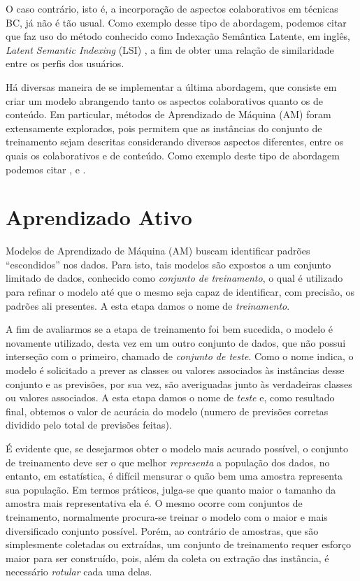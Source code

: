 O caso contrário, isto é, a incorporação de aspectos colaborativos em técnicas BC, já não é tão usual. Como exemplo desse tipo de abordagem, podemos citar \citep{Nicholas99combiningcontent} que faz uso do método conhecido como Indexação Semântica Latente, em inglês, \textit{Latent Semantic Indexing} (LSI) \citep{Berry:1999:USE:307681}, a fim de obter uma relação de similaridade entre os perfis dos usuários.

Há diversas maneira de se implementar a última abordagem, que consiste em criar um modelo abrangendo tanto os aspectos colaborativos quanto os de conteúdo. Em particular, métodos de Aprendizado de Máquina (AM) foram extensamente explorados, pois permitem que as instâncias do conjunto de treinamento sejam descritas considerando diversos aspectos diferentes, entre os quais os colaborativos e de conteúdo. Como exemplo deste tipo de abordagem podemos citar \citep{ansari:2000}, \citep{Condliff99bayesianmixed-effects} e \citep{Popescul01probabilisticmodels}.

\section{Aprendizado Ativo}
\label{sec:aprendizado-ativo}
Modelos de Aprendizado de Máquina (AM) buscam identificar padrões ``escondidos'' nos dados. Para isto, tais modelos são expostos a um conjunto limitado de dados, conhecido como \textit{conjunto de treinamento}, o qual é utilizado para refinar o modelo até que o mesmo seja capaz de identificar, com precisão, os padrões ali presentes. A esta etapa damos o nome de \textit{treinamento}.

A fim de avaliarmos se a etapa de treinamento foi bem sucedida, o modelo é novamente utilizado, desta vez em um outro conjunto de dados, que não possui interseção com o primeiro, chamado de \textit{conjunto de teste}. Como o nome indica, o modelo é solicitado a prever as classes ou valores associados às instâncias desse conjunto e as previsões, por sua vez, são averiguadas junto às verdadeiras classes ou valores associados. A esta etapa damos o nome de \textit{teste} e, como resultado final, obtemos o valor de acurácia do modelo (numero de previsões corretas dividido pelo total de previsões feitas).

É evidente que, se desejarmos obter o modelo mais acurado possível, o conjunto de treinamento deve ser o que melhor \textit{representa} a população dos dados, no entanto, em estatística, é difícil mensurar o quão bem uma amostra representa sua população. Em termos práticos, julga-se que quanto maior o tamanho da amostra mais representativa ela é. O mesmo ocorre com conjuntos de treinamento, normalmente procura-se treinar o modelo com o maior e mais diversificado conjunto possível. Porém, ao contrário de amostras, que são simplesmente coletadas ou extraídas, um conjunto de treinamento requer esforço maior para ser construído, pois, além da coleta ou extração das instância, é necessário \textit{rotular} cada uma delas.


